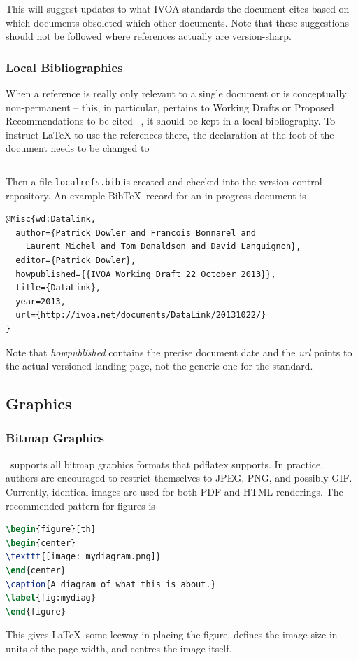 \documentclass[11pt,a4paper]{ivoa}
\newcommand{\BibTeX}{Bib\TeX}
\begin{document}
This will suggest updates to what IVOA standards the document cites
based on which documents obsoleted which other documents.  Note that
these suggestions should not be followed where references actually are
version-sharp.

\subsubsection{Local Bibliographies}

When a reference is really only relevant to a single document or is
conceptually non-permanent -- this, in particular, pertains to Working
Drafts or Proposed Recommendations to be cited --, it should be kept in a
local bibliography.  To instruct \LaTeX{} to use the references there,
the declaration at the foot of the document needs to be
changed to

\begin{lstlisting}

\end{lstlisting}

Then a file \texttt{localrefs.bib} is created and checked into the
version control repository.  An example \BibTeX\ record for an
in-progress document is

\begin{lstlisting}
@Misc{wd:Datalink,
  author={Patrick Dowler and Francois Bonnarel and
    Laurent Michel and Tom Donaldson and David Languignon},
  editor={Patrick Dowler},
  howpublished={{IVOA Working Draft 22 October 2013}},
  title={DataLink},
  year=2013,
  url={http://ivoa.net/documents/DataLink/20131022/}
}
\end{lstlisting}

Note that \emph{howpublished} contains the precise document date and the
\emph{url} points to the actual versioned landing page, not the generic
one for the standard.

\subsection{Graphics}

\subsubsection{Bitmap Graphics}

\ivoatex\ supports all bitmap graphics formats that pdflatex supports.
In practice, authors are encouraged to restrict themselves to JPEG, PNG,
and possibly GIF.  Currently, identical images are used for both PDF and
HTML renderings.  The recommended pattern for figures is
\begin{lstlisting}[language=tex]
\begin{figure}[th]
\begin{center}
\texttt{[image: mydiagram.png]}
\end{center}
\caption{A diagram of what this is about.}
\label{fig:mydiag}
\end{figure}
\end{lstlisting}
This gives \LaTeX\ some leeway in placing the figure, defines the image
size in units of the page width, and centres the image itself.
\end{document}
